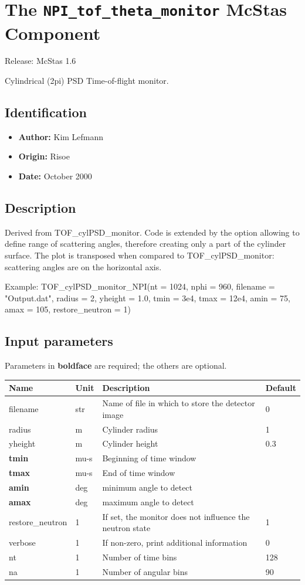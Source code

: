 \section{The \texttt{NPI\_tof\_theta\_monitor} McStas Component}
Release: McStas 1.6

Cylindrical (2pi) PSD Time-of-flight monitor.

\subsection*{Identification}
\begin{itemize}
  \item \textbf{Author:} Kim Lefmann
  \item \textbf{Origin:} Risoe
  \item \textbf{Date:} October 2000
\end{itemize}

\subsection*{Description}
Derived from TOF\_cylPSD\_monitor. Code is extended by the option allowing to define range of scattering angles, therefore creating only a part of the cylinder surface. The plot is transposed when compared to TOF\_cylPSD\_monitor: scattering angles are on the horizontal axis.

Example: TOF\_cylPSD\_monitor\_NPI(nt = 1024, nphi = 960, filename = "Output.dat", radius = 2, yheight = 1.0, tmin = 3e4, tmax = 12e4, amin = 75, amax = 105, restore\_neutron = 1)

\subsection*{Input parameters}
Parameters in \textbf{boldface} are required; the others are optional.

\begin{longtable}{p{}p{}p{}p{}}
\toprule
\textbf{Name} & \textbf{Unit} & \textbf{Description} & \textbf{Default} \\
\midrule
\endhead
filename & str & Name of file in which to store the detector image & 0 \\
radius & m & Cylinder radius & 1 \\
yheight & m & Cylinder height & 0.3 \\
\textbf{tmin} & mu-s & Beginning of time window &  \\
\textbf{tmax} & mu-s & End of time window &  \\
\textbf{amin} & deg & minimum angle to detect &  \\
\textbf{amax} & deg & maximum angle to detect &  \\
restore\_neutron & 1 & If set, the monitor does not influence the neutron state & 1 \\
verbose & 1 & If non-zero, print additional information & 0 \\
nt & 1 & Number of time bins & 128 \\
na & 1 & Number of angular bins & 90 \\
\bottomrule
\end{longtable}

